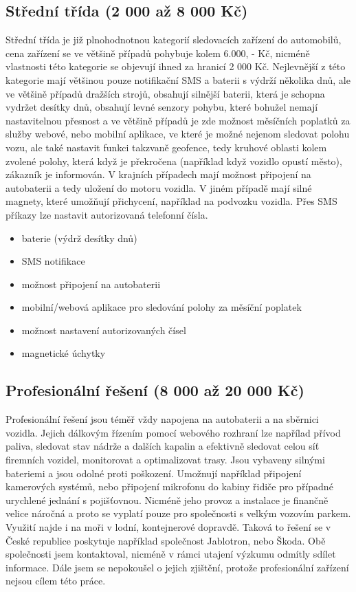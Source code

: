 \documentclass[FM,BP]{tulthesis}  %
\begin{document}
\subsection{Střední třída (2 000 až 8 000 Kč)}
Střední třída je již plnohodnotnou kategorií sledovacích zařízení do automobilů, cena zařízení se ve většině případů pohybuje kolem 6.000, - Kč, nicméně vlastnosti této kategorie se objevují ihned za hranicí 2 000 Kč. Nejlevnější z této kategorie mají většinou pouze notifikační SMS a baterii s výdrží několika dnů, ale ve většině případů dražších strojů, obsahují silnější baterii, která je schopna vydržet desítky dnů, obsahují levné senzory pohybu, které bohužel nemají nastavitelnou přesnost a ve většině případů je zde možnost měsíčních poplatků za služby webové, nebo mobilní aplikace, ve které je možné nejenom sledovat polohu vozu, ale také nastavit funkci takzvaně geofence, tedy kruhové oblasti kolem zvolené polohy, která když je překročena (například když vozidlo opustí město), zákazník je informován. V krajních případech mají možnost připojení na autobaterii a tedy uložení do motoru vozidla. V jiném případě mají silné magnety, které umožňují přichycení, například na podvozku vozidla. Přes SMS příkazy lze nastavit autorizovaná telefonní čísla.

\begin{itemize}
\item baterie (výdrž desítky dnů)
\item SMS notifikace
\item možnost připojení na autobaterii
\item mobilní/webová aplikace pro sledování polohy za měsíční poplatek
\item možnost nastavení autorizovaných čísel
\item magnetické úchytky
\end{itemize}

\subsection{Profesionální řešení (8 000 až 20 000 Kč)}
Profesionální řešení jsou téměř vždy napojena na autobaterii a na sběrnici vozidla. Jejich dálkovým řízením pomocí webového rozhraní lze napřílad přívod paliva, sledovat stav nádrže a dalších kapalin a efektivně sledovat celou síť firemních vozidel, monitorovat a optimalizovat trasy. Jsou vybaveny silnými bateriemi a jsou odolné proti poškození. Umožnují například připojení kamerových systémů, nebo připojení mikrofonu do kabiny řidiče pro případné urychlené jednání s pojišťovnou. Nicméně jeho provoz a instalace je finančně velice náročná a proto se vyplatí pouze pro společnosti s velkým vozovím parkem. Využití najde i na moři v lodní, kontejnerové dopravdě. Taková to řešení se v České republice poskytuje například společnost Jablotron, nebo Škoda. Obě společnosti jsem kontaktoval, nicméně v rámci utajení výzkumu odmítly sdílet informace. Dále jsem se nepokoušel o jejich zjištění, protože profesionální zařízení nejsou cílem této práce. 
\end{document}
